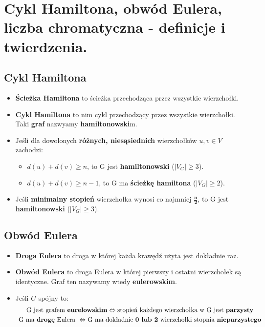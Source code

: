 \documentclass[main.tex]{subfiles}
\begin{document}
    \section{Cykl Hamiltona, obwód Eulera, liczba chromatyczna - definicje i twierdzenia.}

    \subsection{Cykl Hamiltona}
    \begin{itemize}
        \item \textbf{Ścieżka Hamiltona} to ścieżka przechodząca przez wszystkie wierzchołki.

        \item \textbf{Cykl Hamiltona} to nim cykl przechodzący przez wszystkie wierzchołki. Taki \textbf{graf}
        nazwyamy \textbf{hamiltonowski}m.

        \item Jeśli dla dowolonych \textbf{różnych, niesąsiednich} wierzchołków $u, v \in V$ zachodzi:
        \begin{itemize}
            \item $d(u) + d(v) \geq n$, to G jest \textbf{hamiltonowski} ($|V_G| \geq 3$).
            \item $d(u) + d(v) \geq n-1$, to G ma \textbf{ścieżkę hamiltona} ($|V_G| \geq 2$).
        \end{itemize}
        \item Jeśli \textbf{minimalny stopień} wierzchołka wynosi co najmniej $\mathbf{\frac{n}{2}}$, to G jest
        \textbf{hamiltonowski} ($|V_G| \geq 3$).
    \end{itemize}

    \subsection{Obwód Eulera}
    \begin{itemize}
        \item \textbf{Droga Eulera} to droga w której każda krawędź użyta jest dokładnie raz.

        \item \textbf{Obwód Eulera} to droga Eulera w której pierwszy i ostatni wierzchołek są identyczne.
        Graf ten nazywamy wtedy \textbf{eulerowskim}.

        \item Jeśli $G$ spójny to:
        \begin{gather*}
            \text{ G jest grafem \textbf{eurelowskim}} \Leftrightarrow \text{stopień każdego wierzchołka w G jest \textbf{parzysty}}\\
            \text{  G ma \textbf{drogę} Eulera } \Leftrightarrow \text {G ma dokładnie \textbf{0 lub 2} wierzchołki
            stopnia \textbf{nieparzystego}}
        \end{gather*}
    \end{itemize}
\end{document}
